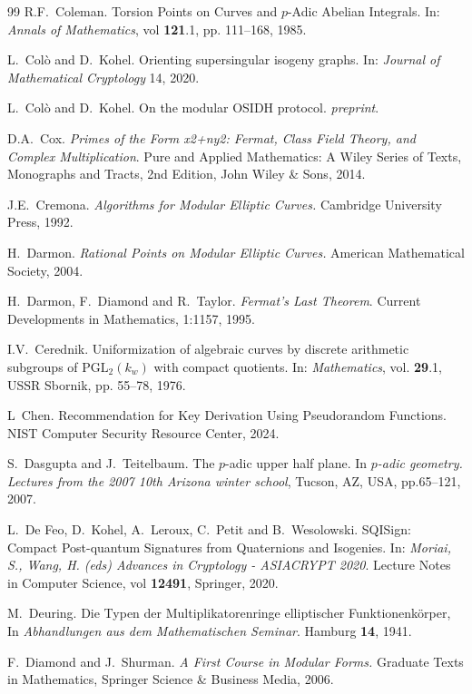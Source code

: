 \documentclass[10pt]{amsart}
\theoremstyle{theostyle}
\newcommand{\PGL}{\mathrm{PGL}}
\begin{document}
\begin{thebibliography}{99}
R.F.~Coleman. 
Torsion Points on Curves and $p$-Adic Abelian Integrals. 
In: {\it Annals of Mathematics}, vol {\bf121}.1, pp. 111--168, 1985.

L.~Colò and D.~Kohel. 
Orienting supersingular isogeny graphs.
In: {\it Journal of Mathematical
Cryptology} 14, 2020.

L.~Colò and D.~Kohel. 
On the modular OSIDH protocol.
{\it preprint}.

D.A.~Cox.
{\it Primes of the Form x2+ny2: Fermat, Class Field Theory, and Complex Multiplication}.
Pure and Applied Mathematics: A Wiley Series of Texts, Monographs and Tracts, 2nd Edition, John Wiley \& Sons, 2014.

J.E.~Cremona.
{\it Algorithms for Modular Elliptic Curves.}
Cambridge University Press, 1992.

H.~Darmon.
{\it Rational Points on Modular Elliptic Curves.}
American Mathematical Society, 2004.

H.~Darmon, F.~Diamond and R.~Taylor. 
{\it Fermat's Last Theorem}. Current Developments in Mathematics, 1:1157, 1995.

I.V.~Cerednik. 
Uniformization of algebraic curves by discrete arithmetic subgroups of $\PGL_2(k_w)$ with compact quotients.
 In: {\it Mathematics}, vol. {\bf 29}.1, USSR Sbornik, pp. 55--78, 1976.

L~Chen.
Recommendation for Key Derivation Using Pseudorandom Functions.
NIST Computer Security Resource Center, 2024.

S.~Dasgupta and J.~Teitelbaum.
The $p$-adic upper half plane.
In {\it $p$-adic geometry. Lectures from the 2007 10th Arizona winter school}, Tucson, AZ, USA, pp.65--121, 2007.

L.~De Feo, D.~Kohel, A.~Leroux, C.~Petit and B.~Wesolowski. 
SQISign: Compact Post-quantum Signatures from Quaternions and Isogenies. 
In: {\it Moriai, S., Wang, H. (eds) Advances in Cryptology - ASIACRYPT 2020}. Lecture Notes in Computer Science, vol {\bf 12491}, Springer, 2020.

M.~Deuring.
Die Typen der Multiplikatorenringe elliptischer Funktionenk\"{o}rper, In {\it Abhandlungen aus dem Mathematischen Seminar}. Hamburg {\bf 14}, 1941.

F.~Diamond and J.~Shurman.
{\it A First Course in Modular Forms.}
Graduate Texts in Mathematics, Springer Science \& Business Media, 2006.


\end{thebibliography}
\end{document}
